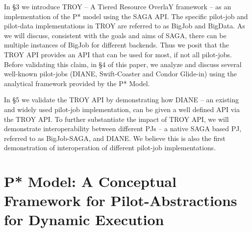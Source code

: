 \documentclass[conference,final]{IEEEtran}
\newcommand{\jhanote}[1]{ {\textcolor{red} { ***shantenu: #1 }}}
\newcommand{\jhanote}[1]{}
\newcommand{\upp}{\vspace*{-0.5em}}
\begin{document}
In \S3 we introduce TROY -- A Tiered Resource OverlaY framework -- as
an implementation of the P* model using the SAGA API. The specific
pilot-job and pilot-data implementations in TROY are referred to as
BigJob and BigData. As we will discuss, consistent with the goals and
aims of SAGA, there can be multiple %
instances of BigJob for different backends.  Thus we posit that the
TROY API provides an API that can be used for most, if not all
pilot-jobs. Before validating this claim, in \S4 of this paper, we
analyze and discuss several well-known pilot-jobs (DIANE,
Swift-Coaster and Condor Glide-in) using the analytical framework
provided by the P* Model.


In \S5 we validate the TROY API by demonstrating how DIANE -- an existing and
widely used pilot-job implementation, can be given a well defined API via the
TROY API. To further substantiate the impact of TROY API, we will demonstrate
interoperability between different PJs -- a native SAGA based PJ, referred to as
BigJob-SAGA, and DIANE. We believe this is also the first demonstration of
interoperation of different pilot-job implementations.





\section{P* Model: A Conceptual Framework for Pilot-Abstractions for
  Dynamic Execution \upp\upp}
\label{sec:pilot-model}
\end{document}
